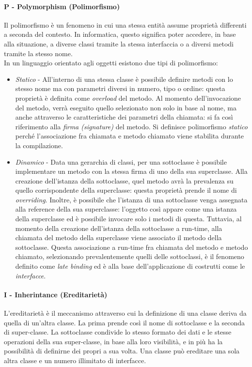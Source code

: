 \documentclass{article}
\begin{document}
            \paragraph{P - Polymorphism (Polimorfismo)} Il polimorfismo è un fenomeno in cui una stessa entità assume proprietà differenti a seconda del contesto. In informatica, questo significa poter accedere, in base alla situazione, a diverse classi tramite la stessa interfaccia o a diversi metodi tramite la stesso nome.\\
                In un linguaggio orientato agli oggetti esistono due tipi di polimorfismo:
                \begin{itemize}
                    \item \textit{Statico} - All'interno di una stessa classe è possibile definire metodi con lo stesso nome ma con parametri diversi in numero, tipo o ordine: questa proprietà è definita come \textit{overload} del metodo. Al momento dell'invocazione del metodo, verrà eseguito quello selezionato non solo in base al nome, ma anche attraverso le caratteristiche dei parametri della chiamata: si fa così riferimento alla \textit{firma (signature)} del metodo. Si definisce polimorfismo \textit{statico} perché l'associazione fra chiamata e metodo chiamato viene stabilita durante la compilazione.
                    \item \textit{Dinamico} - Data una gerarchia di classi, per una sottoclasse è possibile implementare un metodo con la stessa firma di uno della sua superclasse. Alla creazione dell'istanza della sottoclasse, quel metodo avrà la prevalenza su quello corrispondente della superclasse: questa proprietà prende il nome di \textit{overriding}. Inoltre, è possibile che l'istanza di una sottoclasse venga assegnata alla reference della sua superclasse: l'oggetto così appare come una istanza della superclasse ed è possibile invocare solo i metodi di questa. Tuttavia, al momento della creazione dell'istanza della sottoclasse a run-time, alla chiamata del metodo della superclasse viene associato il metodo della sottoclasse. Questa associazione a run-time fra chiamata del metodo e metodo chiamato, selezionando prevalentemente quelli delle sottoclassi, è il fenomeno definito come \textit{late binding} ed è alla base dell'applicazione di costrutti come le \textit{interfacce}.
                \end{itemize}
            
            \paragraph{I - Inherintance (Ereditarietà)} L'ereditarietà è il meccanismo attraverso cui la definizione di una classe deriva da quella di un'altra classe. La prima prende così il nome di sottoclasse e la seconda di super-classe. La sottoclasse condivide lo stesso formato dei dati e le stesse operazioni della sua super-classe, in base alla loro visibilità, e in più ha la possibilità di definirne dei propri a sua volta. Una classe può ereditare una sola altra classe e un numero illimitato di interfacce.
            
\end{document}
